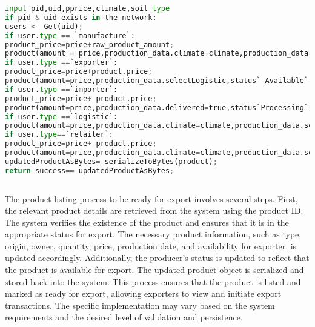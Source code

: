 \begin{lstlisting}[language=Python , caption=product listing]
input pid,uid,pprice,climate,soil type
if pid & uid exists in the network:
users <- Get(uid);
if user.type == `manufacture`:
product_price=price+raw_product_amount;
product(amount = price,production_data.climate=climate,production_data.soil_type=soil_type,status`Available`,product.availableFor=`exporter`)
if user.type ==`exporter`:
product_price=price+product.price;
product(amount=price,production_data.selectLogistic,status` Available` ,product.availableFor=`importer`)
if user.type ==`importer`:
product_price=price+ product.price;
product(amount=price,production_data.delivered=true,status`Processing`)
if user.type ==`logistic`:
product(amount=price,production_data.climate=climate,production_data.soil_type=soil_type,status`Available` ,product.availableFor=`retailer`)
if user.type==`retailer`:
product_price=price+ product.price;
product(amount=price,production_data.climate=climate,production_data.soil_type=soil_type,status`Available` ,product.availableFor=`consumer`)
updatedProductAsBytes= serializeToBytes(product);
return success== updatedProductAsBytes;
      
\end{lstlisting}
The product listing process to be ready for export involves several steps. First, the relevant product details are retrieved from the system using the product ID. The system verifies the existence of the product and ensures that it is in the appropriate status for export. The necessary product information, such as type, origin, owner, quantity, price, production date, and availability for exporter, is updated accordingly. Additionally, the producer's status is updated to reflect that the product is available for export. The updated product object is serialized and stored back into the system. This process ensures that the product is listed and marked as ready for export, allowing exporters to view and initiate export transactions. The specific implementation may vary based on the system requirements and the desired level of validation and persistence.